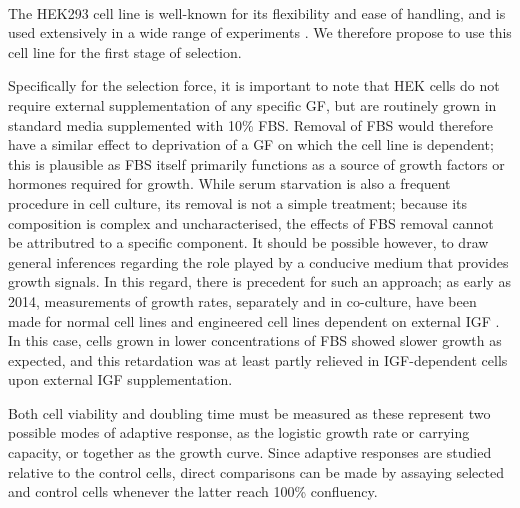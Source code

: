 \documentclass[12pt, letterpaper, onecolumn]{article}
\begin{document}
	\paragraph{\empty}The HEK293 cell line is well-known for its flexibility and ease of handling, and is used extensively in a wide range of experiments \cite{Thomas2005}. We therefore propose to use this cell line for the first stage of selection.
	
	
	Specifically for the selection force, it is important to note that HEK cells do not require external supplementation of any specific GF, but are routinely grown in standard media supplemented with 10\% FBS. Removal of FBS would therefore have a similar effect to deprivation of a GF on which the cell line is dependent; this is plausible as FBS itself primarily functions as a source of growth factors or hormones required for growth. While serum starvation is also a frequent procedure in cell culture, its removal is not a simple treatment; because its composition is complex and uncharacterised, the effects of FBS removal cannot be attributred to a specific component. It should be possible however, to draw general inferences regarding the role played by a conducive medium that provides growth signals. In this regard, there is precedent for such an approach; as early as 2014, measurements of growth rates, separately and in co-culture, have been made for normal cell lines and engineered cell lines dependent on external IGF \cite{Archetti2015}. In this case, cells grown in lower concentrations of FBS showed slower growth as expected, and this retardation was at least partly relieved in IGF-dependent cells upon external IGF supplementation.
	
	
	Both cell viability and doubling time must be measured as these represent two possible modes of adaptive response, as the logistic growth rate or carrying capacity, or together as the growth curve. Since adaptive responses are studied relative to the control cells, direct comparisons can be made by assaying selected and control cells whenever the latter reach 100\% confluency.
	
	
\end{document}
